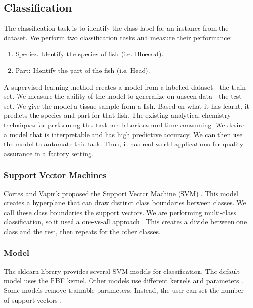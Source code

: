 \documentclass{article}
\begin{document}
\subsection{Classification}
\label{sec:background-classification}

The classification task is to identify the class label for an instance from the dataset.
We perform two classification tasks and measure their performance:

\begin{enumerate}
  \item Species: Identify the species of fish (i.e. Bluecod).
  \item Part: Identify the part of the fish (i.e. Head).
\end{enumerate}

A supervised learning method creates a model from a labelled dataset - the train set.
We measure the ability of the model to generalize on unseen data - the test set.
We give the model a tissue sample from a fish.
Based on what it has learnt, it predicts the species and part for that fish.
The existing analytical chemistry techniques for performing this task are laborious and time-consuming.
We desire a model that is interpretable and has high predictive accuracy.
We can then use the model to automate this task.
Thus, it has real-world applications for quality assurance in a factory setting.

\subsubsection{Support Vector Machines}
\label{sec:background-svm}

Cortes and Vapnik proposed the Support Vector Machine (SVM) \cite{cortes1995support}.
This model creates a hyperplane that can draw distinct class boundaries between classes.
We call these class boundaries the support vectors.
We are performing multi-class classification, so it used a one-vs-all approach \cite{sklearn2021feature}.
This creates a divide between one class and the rest, then repeats for the other classes.

\subsubsection{Model}
\label{sec:background-svm-model}

The sklearn library provides several SVM models for classification.
The default model uses the RBF kernel.
Other models use different kernels and parameters \cite{sklearn2021feature}.
Some models remove trainable parameters.
Instead, the user can set the number of support vectors \cite{scholkopf2000new}.
\end{document}
